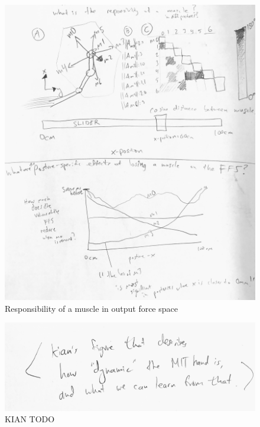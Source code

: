 \documentclass[utf8]{frontiersSCNS} %
\begin{document}
\begin{figure}[h!]
\begin{center}
\includegraphics[width=15cm]{figures/responsibility_of_a_muscle/responsibility_of_a_muscle.jpg}%
\end{center}
\caption{Responsibility of a muscle in output force space }
\label{fig:responsibility_of_a_muscle}
\end{figure}

\begin{figure}[h!]
\begin{center}
\includegraphics[width=15cm]{figures/dynamics_vs_statics/dynamics_vs_statics.jpg}%
\end{center}
\caption{KIAN TODO}
\label{fig:dynamics_vs_statics}
\end{figure}


\end{document}
